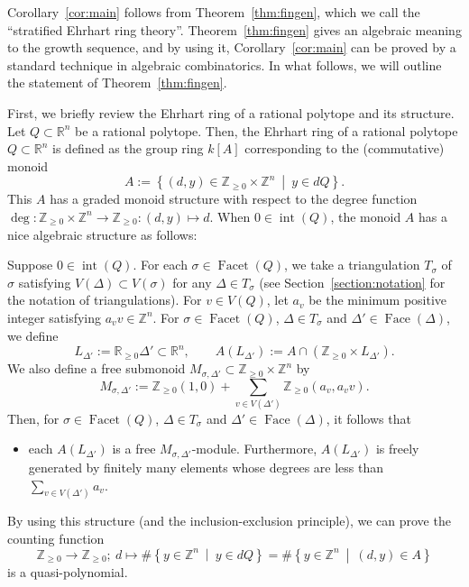 \documentclass[11pt]{article}
\theoremstyle{definition}
\numberwithin{equation}{section}
\begin{document}
Corollary~\ref{cor:main} follows from Theorem~\ref{thm:fingen}, which we call the ``stratified Ehrhart ring theory''.
Theorem~\ref{thm:fingen} gives an algebraic meaning to the growth sequence, and by using it, 
Corollary~\ref{cor:main} can be proved by a standard technique in algebraic combinatorics. 
In what follows, we will outline the statement of Theorem~\ref{thm:fingen}. 

First, we briefly review the Ehrhart ring of a rational polytope and its structure.
Let $Q \subset \mathbb{R}^n$ be a rational polytope. 
Then, the Ehrhart ring of a rational polytope $Q \subset \mathbb{R}^n$ is defined as the group ring $k[A]$ corresponding to the (commutative) monoid
\[
A := \left \{ (d, y) \in \mathbb{Z}_{\ge 0} \times \mathbb{Z}^n \ \middle | \ y \in dQ\right \}. 
\]
This $A$ has a graded monoid structure with respect to the degree function $\operatorname{deg}: \mathbb{Z}_{\ge 0} \times \mathbb{Z}^n \to \mathbb{Z}_{\ge 0}: (d,y) \mapsto d$. 
When $0 \in \operatorname{int}(Q)$, the monoid $A$ has a nice algebraic structure as follows: 
 
\begin{fact}[{cf.\ \cite[Section 3.2]{BR}}]\label{fact}
Suppose $0 \in \operatorname{int}(Q)$. 
For each $\sigma \in \operatorname{Facet}(Q)$, we take a triangulation $T_{\sigma}$ of $\sigma$ satisfying 
$V(\Delta) \subset V(\sigma)$ for any $\Delta \in T_{\sigma}$ (see Section~\ref{section:notation} for the notation of triangulations). 
For $v \in V(Q)$, let $a_v$ be the minimum positive integer satisfying $a_v v \in \mathbb{Z}^n$. 
For $\sigma \in \operatorname{Facet}(Q)$, $\Delta \in T_{\sigma}$ and $\Delta' \in \operatorname{Face}(\Delta)$, we define 
\[
L_{\Delta'} := \mathbb{R}_{\ge 0} \Delta' \subset \mathbb{R}^n, \qquad 
A \left( L_{\Delta'} \right) := A \cap \left( \mathbb{Z}_{\ge 0} \times L_{\Delta'} \right). 
\]
We also define a free submonoid $M_{\sigma , \Delta'} \subset \mathbb{Z}_{\ge 0} \times \mathbb{Z}^n$ by 
\[
M_{\sigma , \Delta'} := 
\mathbb{Z}_{\ge 0}(1,0) + 
\sum _{v \in V(\Delta')} \mathbb{Z}_{\ge 0} (a_v, a_v v). 
\]
Then, for $\sigma \in \operatorname{Facet}(Q)$, $\Delta \in T_{\sigma}$ and $\Delta' \in \operatorname{Face}(\Delta)$, it follows that 
\begin{itemize}
\item
each $A \left( L_{\Delta'} \right)$ is a free $M_{\sigma , \Delta'}$-module. 
Furthermore, $A \left( L_{\Delta'} \right)$ is freely generated by finitely many elements whose degrees are less than $\sum _{v \in V(\Delta')} a_v$. 
\end{itemize}
\end{fact}
\noindent
By using this structure (and the inclusion-exclusion principle), we can prove the counting function 
\[
\mathbb{Z}_{\ge 0} \to \mathbb{Z}_{\ge 0}; \ d \mapsto 
\# \left\{ y \in \mathbb{Z}^n \ \middle | \ y \in dQ  \right\}
= \# \left\{ y \in \mathbb{Z}^n \ \middle | \ (d,y) \in A \right\}
\]
is a quasi-polynomial. 
\end{document}
